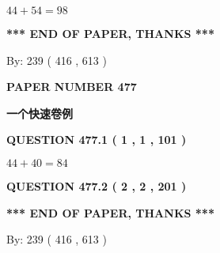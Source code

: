 \documentclass{ctexart}
\begin{document}
 

$ %
44 +  %
54=   %
98$
 
 
   
   
 \vspace{0.2in}
 
   
   
   
   
\vspace{1.0in} 
{\textbf{\large{ *** END OF PAPER, THANKS *** }}} 
   
   
\hspace{1.0in} By: 
 239 ( 416 ,  613 )
   
   
   
   
\newpage 
\setcounter{page}{ 
   477001 } 
   
   
   
   
 {\textbf{ \Large{ PAPER NUMBER  477  }}}
   
   
\vspace{0.2in}
   
   
   
   
   
   
 \vspace{0.2in}
{\LARGE {\textbf{ 一个快速卷例}}}
   
   
  
\vspace{0.2in}
  
{\textbf{\Large{QUESTION
477.1 
 ( 1 , 1 , 101 )
}}}
  
  
 
 

$ %
44 +  %
40=   %
84$
 
 
  
\vspace{0.2in}
  
{\textbf{\Large{QUESTION
477.2 
 ( 2 , 2 , 201 )
}}}
  
  
   
   
 \vspace{0.2in}
 
   
   
   
   
\vspace{1.0in} 
{\textbf{\large{ *** END OF PAPER, THANKS *** }}} 
   
   
\hspace{1.0in} By: 
 239 ( 416 ,  613 )
   
   
   
\end{document}
